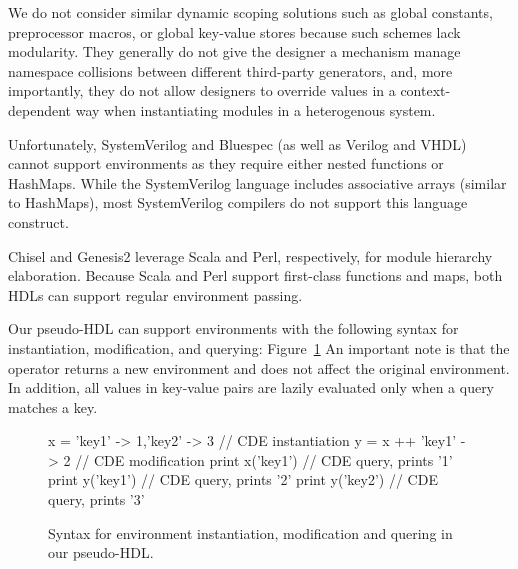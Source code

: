 We do not consider similar dynamic scoping solutions such as global constants, preprocessor macros, or global key-value stores because such schemes lack modularity.
They generally do not give the designer a mechanism manage namespace collisions between different third-party generators, 
and, more importantly, they do not allow designers to override values in a context-dependent way when instantiating modules in a heterogenous system.

Unfortunately, SystemVerilog and Bluespec (as well as Verilog and VHDL) cannot support environments as they require either nested functions or HashMaps. %
 While the SystemVerilog language includes associative arrays (similar to HashMaps), most SystemVerilog compilers do not support this language construct. 

Chisel and Genesis2 leverage Scala and Perl, respectively, for module hierarchy elaboration. Because Scala and Perl support first-class functions and maps, both HDLs can support regular environment passing.



Our pseudo-HDL can support environments with the following syntax for instantiation, modification, and querying:
Figure~\ref{fig:env-phdl}
An important note is that the \code{++}  operator returns a new environment and does not affect the original environment. In addition, all values in key-value pairs are lazily evaluated only when a query matches a key.

\begin{figure}
\centering
\begin{phdl}
x = {'key1' -> 1,'key2' -> 3} // CDE instantiation
y = x ++ {'key1' -> 2}        // CDE modification
print x('key1')               // CDE query, prints '1'
print y('key1')               // CDE query, prints '2'
print y('key2')               // CDE query, prints '3'
\end{phdl}
\caption{Syntax for environment instantiation, modification and quering in our pseudo-HDL.}
\label{fig:env-phdl}
\end{figure}


